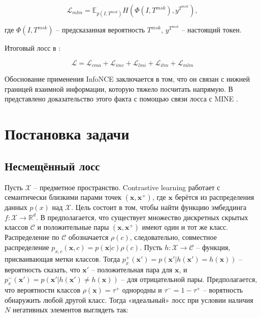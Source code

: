 \documentclass[a4paper, 14pt]{article}
\begin{document}
\begin{equation}
    \mathcal{L}_{mlm} = \mathbb{E}_{p(I, T^{msk})}H(\Phi(I, T^{msk}), y^{T^{msk}}),
\end{equation}

\noindent где $\Phi(I, T^{msk})$ -- предсказанная вероятность $T^{msk}$, $y^{T^{msk}}$ -- настоящий токен.

Итоговый лосс в \citep{TCL}:

\begin{equation}
    \mathcal{L} = \mathcal{L}_{cma} + \mathcal{L}_{imc} + \mathcal{L}_{lmi} + \mathcal{L}_{itm} + \mathcal{L}_{mlm}
\end{equation}

Обоснование применения InfoNCE заключается в том, что он связан с нижней границей взаимной информации, которую тяжело посчитать напрямую. В \citep{Oord2018RepresentationLW} представлено доказательство этого факта с помощью связи лосса с MINE \citep{belghazi2021mine}.

\newpage
\section{Постановка задачи}

\subsection{Несмещённый лосс}

Пусть $\mathcal{X}$ -- предметное пространство. Contrastive learning работает с семантически близкими парами точек $(\mathbf{x}, \mathbf{x}^+)$, где $\mathbf{x}$ берётся из распределения данных $p(x)$ над $\mathcal{X}$. Цель состоит в том, чтобы найти функцию эмбеддинга $f: \mathcal{X} \rightarrow \mathbb{R}^d$. В \citep{chuang2020debiased} предполагается, что существует множество дискретных скрытых классов $\mathcal{C}$ и положительные пары $(\mathbf{x}, \mathbf{x}^+)$ имеют один и тот же класс. Распределение по $\mathcal{C}$ обозначается $\rho(c)$, следовательно, совместное
распределение $p_{x,c}(\textbf{x}, c) = p(\textbf{x}|c)\rho(c)$. Пусть $h : \mathcal{X} \rightarrow \mathcal{C}$ -- функция, присваивающая метки классов. Тогда $p^+_x(\textbf{x}') = p(\textbf{x}'|h(\textbf{x}') = h(\textbf{x}))$ -- вероятность сказать, что $\textbf{x}'$ -- положительная пара для $\textbf{x}$, и $p^-_x(\textbf{x}') = p(\textbf{x}'|h(\textbf{x}') \neq h(\textbf{x}))$ -- для отрицательной пары. Предполагается, что вероятности классов $\rho(\textbf{x}) = \tau^+$ однородны и $\tau^- = 1 - \tau^+$ -- ворятность обнаружить любой другой класс. Тогда «идеальный» лосс при условии наличия $N$ негативных элементов выглядеть так:
\end{document}
